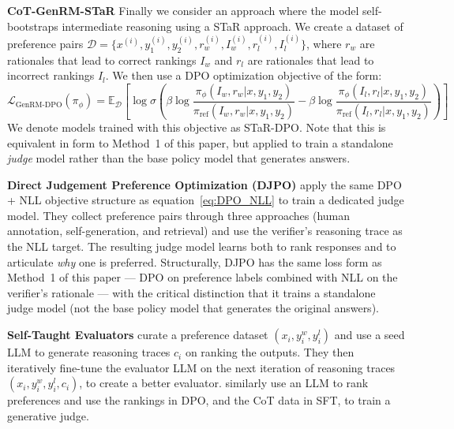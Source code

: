 \vspace{1em}
\textbf{CoT-GenRM-STaR}
Finally we consider an approach where the model self-bootstraps intermediate reasoning using a STaR approach. We create a dataset of preference pairs $\mathcal{D} = \{x^{(i)}, y_1^{(i)}, y_2^{(i)}, r_w^{(i)}, I_w^{(i)}, r_l^{(i)}, I_l^{(i)}\}$, where $r_w$ are rationales that lead to correct rankings $I_w$ and $r_l$ are rationales that lead to incorrect rankings $I_l$. We then use a DPO optimization objective of the form:
\begin{equation}
    \mathcal{L}_\text{GenRM-DPO}(\pi_\phi) = \mathbb{E}_\mathcal{D}\left[\log\sigma\left(\beta\log\frac{\pi_\phi(I_w, r_w|x, y_1, y_2)}{\pi_\text{ref}(I_w, r_w|x, y_1, y_2)} - \beta\log\frac{\pi_\phi(I_l, r_l|x, y_1, y_2)}{\pi_\text{ref}(I_l, r_l|x, y_1, y_2)}\right)\right]
\end{equation}
We denote models trained with this objective as STaR-DPO. Note that this is equivalent in form to Method~1 of this paper, but applied to train a standalone \emph{judge} model rather than the base policy model that generates answers.

\vspace{1em}
\textbf{Direct Judgement Preference Optimization (DJPO)}
\autocite{wang2024directjudgementpreferenceoptimization} apply the same DPO + NLL objective structure as equation~\ref{eq:DPO_NLL} to train a dedicated judge model. They collect preference pairs through three approaches (human annotation, self-generation, and retrieval) and use the verifier's reasoning trace as the NLL target. The resulting judge model learns both to rank responses and to articulate \emph{why} one is preferred. Structurally, DJPO has the same loss form as Method~1 of this paper --- DPO on preference labels combined with NLL on the verifier's rationale --- with the critical distinction that it trains a standalone judge model (not the base policy model that generates the original answers).

\vspace{1em}
\textbf{Self-Taught Evaluators}
\autocite{wang2024selftaughtevaluators} curate a preference dataset $(x_i, y_i^{w}, y_i^{l})$ and use a seed LLM to generate reasoning traces $c_i$ on ranking the outputs. They then iteratively fine-tune the evaluator LLM on the next iteration of reasoning traces $(x_i, y_i^{w}, y_i^{l},c_i)$, to create a better evaluator. \autocite{ye2024scalarrewardmodellearning} similarly use an LLM to rank preferences and use the rankings in DPO, and the CoT data in SFT, to train a generative judge.

